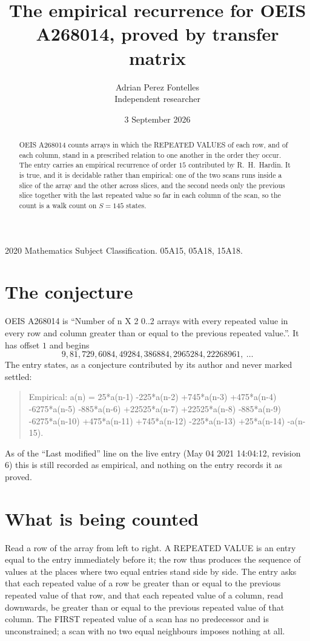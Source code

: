 \documentclass[11pt,a4paper]{article}
\title{The empirical recurrence for OEIS A268014, proved by transfer matrix}
\author{Adrian Perez Fontelles\\ \small Independent researcher}
\date{3 September 2026}
\theoremstyle{plain}
\theoremstyle{definition}
\begin{document}
\maketitle

\begin{abstract}
OEIS A268014 counts arrays in which the REPEATED VALUES of each row, and of each column, stand in a
prescribed relation to one another in the order they occur. The entry carries an empirical
recurrence of order $15$ contributed by R.~H.~Hardin. It is true, and it is decidable
rather than empirical: one of the two scans runs inside a slice of the array and the other
across slices, and the second needs only the previous slice together with the last repeated
value so far in each column of the scan, so the count is a walk count on $S=145$ states.
\end{abstract}

\noindent\small 2020 Mathematics Subject Classification. 05A15, 05A18, 15A18.\normalsize

\section{The conjecture}

OEIS A268014 is ``Number of n X 2 0..2 arrays with every repeated value in every row and column greater than or equal to the previous repeated value.''. It has offset $1$ and begins
\[
9, 81, 729, 6084, 49284, 386884, 2965284, 22268961,\ \dots
\]
The entry states, as a conjecture contributed by its author and never marked settled:
\begin{quote}
Empirical: a(n) = 25*a(n-1) -225*a(n-2) +745*a(n-3) +475*a(n-4) -6275*a(n-5) -885*a(n-6) +22525*a(n-7) +22525*a(n-8) -885*a(n-9) -6275*a(n-10) +475*a(n-11) +745*a(n-12) -225*a(n-13) +25*a(n-14) -a(n-15).
\end{quote}
As of the ``Last modified'' line on the live entry (May 04 2021 14:04:12, revision 6) this is still
recorded as empirical, and nothing on the entry records it as proved.

\section{What is being counted}

Read a row of the array from left to right. A REPEATED VALUE is an entry equal to the entry
immediately before it; the row thus produces the sequence of values at the places where two
equal entries stand side by side. The entry asks that each repeated value of a row be
greater than or equal to the previous repeated value of that row, and that each repeated value of a column,
read downwards, be greater than or equal to the previous repeated value of that column. The FIRST repeated
value of a scan has no predecessor and is unconstrained; a scan with no two equal neighbours
imposes nothing at all.
\end{document}
